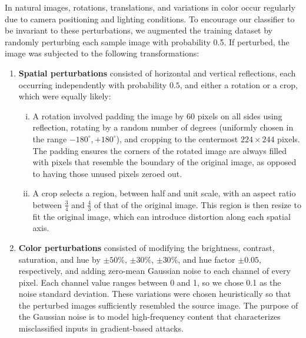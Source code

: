 \documentclass[justified]{article}
\begin{document}
  In natural images, rotations, translations, and variations in color occur regularly due to camera positioning and lighting conditions.
  To encourage our classifier to be invariant to these perturbations, we augmented the training dataset by randomly perturbing each sample image with probability 0.5. If perturbed, the image was subjected to the following transformations:
  \begin{enumerate}
  \item
    \textbf{Spatial perturbations} consisted of horizontal and vertical reflections, each occurring independently with probability $0.5$, and either a rotation or a crop, which were equally likely:
    \begin{enumerate}[(i)]
    \item
      A rotation involved padding the image by 60 pixels on all sides using reflection, rotating by a random number of degrees (uniformly chosen in the range $-180^\circ, +180^\circ$), and cropping to the centermost $224 \times 244$ pixels.
      The padding ensures the corners of the rotated image are always filled with pixels that resemble the boundary of the original image, as opposed to having those unused pixels zeroed out.

    \item
      A crop selects a region, between half and unit scale, with an aspect ratio between $\frac{3}{4}$ and $\frac{4}{3}$ of that of the original image.
      This region is then resize to fit the original image, which can introduce distortion along each spatial axis.
    \end{enumerate}

  \item
    \textbf{Color perturbations} consisted of modifying the brightness, contrast, saturation, and hue by $\pm 50\%$, $\pm 30\%$, $\pm 30\%$, and hue factor $\pm 0.05$, respectively, and adding zero-mean Gaussian noise to each channel of every pixel.
    Each channel value ranges between 0 and 1, so we chose 0.1 as the noise standard deviation.
    These variations were chosen heuristically so that the perturbed images sufficiently resembled the source image.
    The purpose of the Gaussian noise is to model high-frequency content that characterizes misclassified inputs in gradient-based attacks.
  \end{enumerate}
\end{document}
